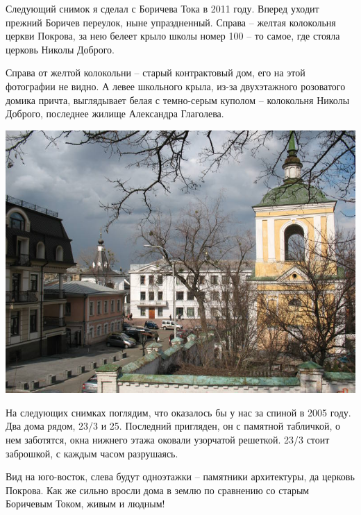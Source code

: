 Следующий снимок я сделал с Боричева Тока в 2011 году. Вперед уходит прежний Боричев переулок, ныне упраздненный. Справа – желтая колокольня церкви Покрова, за нею белеет крыло школы номер 100 – то самое, где стояла церковь Николы Доброго. 

Справа от желтой колокольни – старый контрактовый дом, его на этой фотографии не видно. А левее школьного крыла, из-за двухэтажного розоватого домика причта, выглядывает белая с темно-серым куполом – колокольня Николы Доброго, последнее жилище Александра Глаголева.

\vspace*{\fill}

\begin{center}
\includegraphics[width=\linewidth]{chast-colebanie-osnov/borichev-tok/pok01-1.jpg}
\end{center}

\vspace*{\fill}


На следующих снимках поглядим, что оказалось бы у нас за спиной в 2005 году. Два дома рядом, 23/3 и 25. Последний пригляден, он с памятной табличкой, о нем заботятся, окна нижнего этажа оковали узорчатой решеткой. 23/3 стоит заброшкой, с каждым часом разрушаясь. 

Вид на юго-восток, слева будут одноэтажки – памятники архитектуры, да церковь Покрова. Как же сильно вросли дома в землю по сравнению со старым Боричевым Током, живым и людным! 
 
